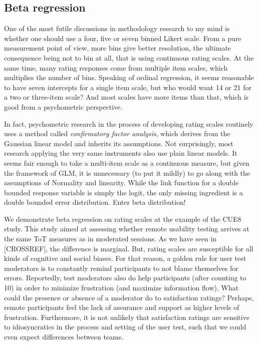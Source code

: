 \documentclass[]{svmono}
\begin{document}
\subsection{Beta regression}\label{beta-regression}

One of the most futile discussions in methodology research to my mind is
whether one should use a four, five or seven binned Likert scale. From a
pure measurement point of view, more bins give better resolution, the
ultimate consequence being not to bin at all, that is using continuous
rating scales. At the same time, many rating responses come from
multiple item scales, which multiplies the number of bins. Speaking of
ordinal regression, it seems reasonable to have seven intercepts for a
single item scale, but who would want 14 or 21 for a two or three-item
scale? And most scales have more items than that, which is good from a
psychometric perspective.

In fact, psychometric research in the process of developing rating
scales routinely uses a method called \emph{confirmatory factor
analysis}, which derives from the Gaussian linear model and inherits its
assumptions. Not surprisingly, most research applying the very same
instruments also use plain linear models. It seems fair enough to take a
multi-item scale as a continuous measure, but given the framework of
GLM, it is unnecessary (to put it mildly) to go along with the
assumptions of Normality and linearity. While the link function for a
double bounded response variable is simply the logit, the only missing
ingredient is a double bounded error distribution. Enter beta
distribution!

We demonstrate beta regression on rating scales at the example of the
CUE8 study. This study aimed at assessing whether remote usability
testing arrives at the same ToT measures as in moderated sessions. As we
have seen in {[}CROSSREF{]}, the difference is marginal. But, rating
scales are susceptible for all kinds of cognitive and social biases. For
that reason, a golden rule for user test moderators is to constantly
remind participants to not blame themselves for errors. Reportedly, test
moderators also do help participants (after counting to 10) in order to
minimize frustration (and maximize information flow). What could the
presence or absence of a moderator do to satisfaction ratings? Perhaps,
remote participants feel the lack of assurance and support as higher
levels of frustration. Furthermore, it is not unlikely that satisfaction
ratings are sensitive to idiosyncratics in the process and setting of
the user test, such that we could even expect differences between teams.
\end{document}
